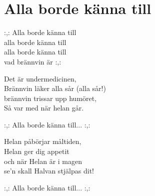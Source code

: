 \section{Alla borde känna till}

:,: Alla borde känna till\\
alla borde känna till\\
alla borde känna till\\
vad brännvin är :,:

Det är undermedicinen,\\
Brännvin läker alla sår (alla sår!)\\
brännvin trissar upp humöret,\\
Så var med när helan går.

:,: Alla borde känna till... :,:

Helan påbörjar måltiden,\\
Helan ger dig appetit\\
och när Helan är i magen\\
se’n skall Halvan stjälpas dit!

:,: Alla borde känna till... :,: